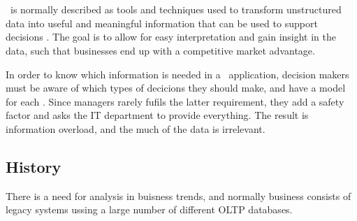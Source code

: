 \section{\bi}
\label{sec:bi-background}
\bi~is normally described as tools and techniques used to transform unstructured data into useful and meaningful information that can be used to support decisions \cite{Wikipedia_contributors2015-ag}. The goal is to allow for easy interpretation and gain insight in the data, such that businesses end up with a competitive market advantage.

In order to know which information is needed in a \bi~application, decision makers must be aware of which types of decicions they should make, and have a model for each \cite{x}. Since managers rarely fufils the latter requirement, they add a safety factor and asks the IT department to provide everything. The result is information overload, and the much of the data is irrelevant. 



\subsection{History}
There is a need for analysis in buisness trends, and normally business consists of legacy systems ussing a large number of different OLTP databases.

